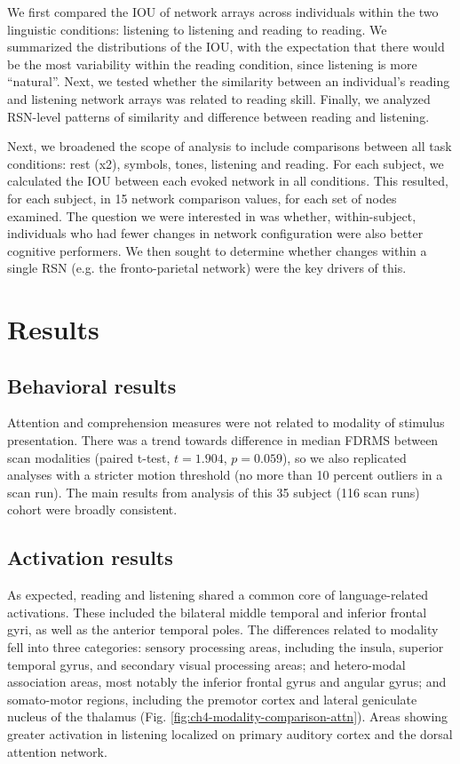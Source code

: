 We first compared the IOU of network arrays across individuals within the two linguistic conditions: listening to listening and reading to reading. We summarized the distributions of the IOU, with the expectation that there would be the most variability within the reading condition, since listening is more ``natural''. Next, we tested whether the similarity between an individual's reading and listening network arrays was related to reading skill. Finally, we analyzed RSN-level patterns of similarity and difference between reading and listening. 

Next, we broadened the scope of analysis to include comparisons between all task conditions: rest (x2), symbols, tones, listening and reading. For each subject, we calculated the IOU between each evoked network in all conditions. This resulted, for each subject, in 15 network comparison values, for each set of nodes examined. The question we were interested in was whether, within-subject, individuals who had fewer changes in network configuration were also better cognitive performers. We then sought to determine whether changes within a single RSN (e.g. the fronto-parietal network) were the key drivers of this. 


\section{Results}

\subsection{Behavioral results}

Attention and comprehension measures were not related to modality of stimulus presentation. There was a trend towards difference in median FDRMS between scan modalities (paired t-test, $t = 1.904$, $p = 0.059$), so we also replicated analyses with a stricter motion threshold (no more than 10 percent outliers in a scan run). The main results from analysis of this 35 subject (116 scan runs) cohort were broadly consistent.

\subsection{Activation results}

As expected, reading and listening shared a common core of language-related activations. These included the bilateral middle temporal and inferior frontal gyri, as well as the  anterior temporal poles. The differences related to modality fell into three categories: sensory processing areas, including the insula, superior temporal gyrus, and secondary visual processing areas; and hetero-modal association areas, most notably the inferior frontal gyrus and angular gyrus; and somato-motor regions, including the premotor cortex and lateral geniculate nucleus of the thalamus (Fig. \ref{fig:ch4-modality-comparison-attn}). Areas showing greater activation in listening localized on primary auditory cortex and the dorsal attention network.

